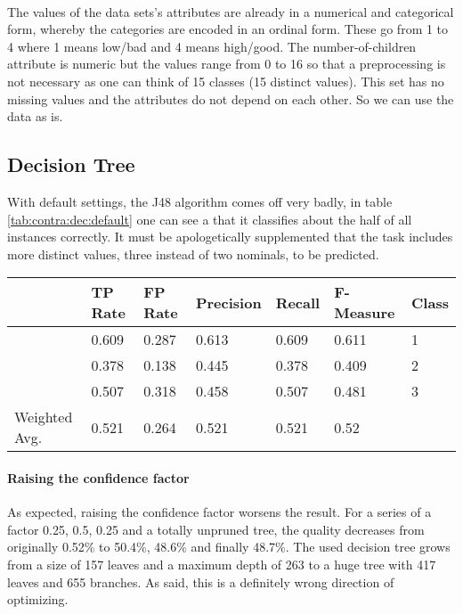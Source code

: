 \documentclass[paper=a4, fontsize=11pt]{scrartcl} %
\numberwithin{equation}{section} %
\numberwithin{figure}{section} %
\numberwithin{table}{section} %
\begin{document}
\paragraph{}The values of the data sets's attributes are already in a numerical and categorical form, whereby the categories are encoded in an ordinal form. These go from 1 to 4 where 1 means low/bad and 4 means high/good. The number-of-children attribute is numeric but the values range from 0 to 16 so that a preprocessing is not necessary as one can think of 15 classes (15 distinct values). This set has no missing values and the attributes do not depend on each other. So we can use the data as is.


\subsection{Decision Tree}

With default settings, the J48 algorithm comes off very badly, in table \ref{tab:contra:dec:default} one can see a that it classifies about the half of all instances correctly. It must be apologetically supplemented that the task includes more distinct values, three instead of two nominals, to be predicted. 

\begin{table*}[htb]\centering
  \begin{tabular*}{\columnwidth}{@{}lllllll@{}}
      \toprule 
               &  TP Rate & FP Rate & Precision & Recall & F-Measure &  Class \\ \midrule 
               &  0.609   & 0.287   & 0.613     & 0.609  & 0.611     &  1     \\  
               &  0.378   & 0.138   & 0.445     & 0.378  & 0.409     &  2     \\      
               &  0.507   & 0.318   & 0.458     & 0.507  & 0.481     &  3     \\      
Weighted Avg.  &  0.521   & 0.264   & 0.521     & 0.521  & 0.52      &        \\ \bottomrule     
    \end{tabular*}
\caption{Decision Tree on Contraceptive Data Set -- Default Settings} 
\label{tab:contra:dec:default}
\end{table*}
\FloatBarrier

\paragraph{Raising the confidence factor}
As expected, raising the confidence factor worsens the result. For a series of a factor 0.25, 0.5, 0.25 and a totally unpruned tree, the quality decreases from originally 0.52\% to 50.4\%, 48.6\% and finally 48.7\%. The used decision tree grows from a size of 157 leaves and a maximum depth of 263 to a huge tree with 417 leaves and 655 branches. As said, this is a definitely wrong direction of optimizing.
\end{document}
